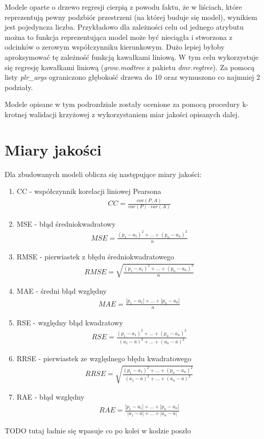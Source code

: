 \documentclass[a4paper,11pt,twoside]{mwrep}  %
\begin{document}
Modele oparte o drzewo regresji cierpią z powodu faktu, że w liściach, które reprezentują pewny podzbiór przestrzeni (na której buduje się model), wynikiem jest pojedyncza liczba. Przykładowo dla zależności celu od jednego atrybutu można to funkcja reprezentująca model może być nieciągła i stworzona z odcinków o zerowym współczynniku kierunkowym. Dużo lepiej byłoby aproksymować tę zależność funkcją kawałkami liniową.  W tym celu wykorzystuje się regresję kawałkami liniową (\textit{grow.modtree} z pakietu \textit{dmr.regtree}). Za pomocą listy \textit{plr\_args} ograniczono głębokość drzewa do 10 oraz wymuszono co najmniej 2 podziały.
\par
Modele opisane w tym podrozdziale zostały ocenione za pomocą procedury k-krotnej walidacji krzyżowej z wykorzystaniem miar jakości opisanych dalej. 

\section{Miary jakości}\label{sect:ocenamodeli}
Dla zbudowanych modeli oblicza się następujące miary jakości:
\begin{enumerate}
\item
CC - współczynnik korelacji liniowej Pearsona\\
\begin{gather*}
	CC =\frac{cov(P,A)}{var(P) \cdot var(A)}
\end{gather*}
\item
MSE - błąd średniokwadratowy
\begin{gather*}
	MSE = \frac{(p_1-a_1)^2+...+(p_n-a_n)^2}{n}
\end{gather*}
\item
RMSE - pierwiastek z błędu średniokwadratowego
\begin{gather*}
	RMSE = \sqrt{\frac{(p_1-a_1)^2+...+(p_n-a_n)^2}{n}}
\end{gather*}
\item
MAE - średni błąd względny
\begin{gather*}
	MAE = \frac{|p_1-a_1|+...+|p_n-a_n|}{n}
\end{gather*}
\item
RSE - względny błąd kwadratowy
\begin{gather*}
	RSE = \frac{(p_1-a_1)^2+...+(p_n-a_n)^2}{(a_1-\overline{a})^2+...+(a_n-\overline{a})^2}
\end{gather*}
\item
RRSE - pierwiastek ze względnego błędu kwadratowego
\begin{gather*}
	RRSE = \sqrt{\frac{(p_1-a_1)^2+...+(p_n-a_n)^2}{(a_1-\overline{a})^2+...+(a_n-\overline{a})^2}}
\end{gather*}
\item
RAE - błąd względny
\begin{gather*}
	RAE = \frac{|p_1-a_1|+...+|p_n-a_n|}{|a_1-\overline{a}|+...+|a_n-\overline{a}|}
\end{gather*}
\end{enumerate}
TODO tutaj ładnie się wpasuje co po kolei w kodzie poszło
\end{document}
